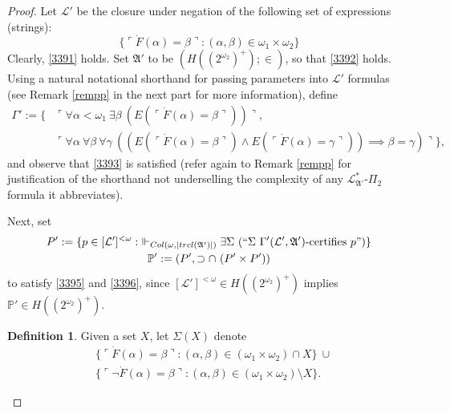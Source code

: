 \documentclass[12pt, twoside]{memoir}
\numberwithin{equation}{section}
\theoremstyle{definition}
\newtheorem{defi}[thm]{Definition}
\theoremstyle{remark}
\theoremstyle{definition}
\theoremstyle{definition}
\theoremstyle{definition}
\theoremstyle{remark}
\begin{document}
\begin{proof}
Let $\mathcal{L}'$ be the closure under negation of the following set of expressions (strings):
\begin{equation*}
    \{\ulcorner \dot{F} (\alpha) = \beta \urcorner : (\alpha, \beta) \in \omega_1 \times \omega_2\}
\end{equation*}
Clearly, \ref{3391} holds. Set $\mathfrak{A}'$ to be $(H((2^{\omega_2})^+); \in)$, so that \ref{3392} holds. Using a natural notational shorthand for passing parameters into $\mathcal{L}'$ formulas (see Remark \ref{rempp} in the next part for more information), define 
\begin{align*}
    \Gamma' := \{ & \ulcorner \forall \alpha < \omega_1 \ \exists \beta \ (E(\ulcorner \dot{F}(\alpha) = \beta \urcorner)) \urcorner, \\ 
    & \ulcorner \forall \alpha \ \forall \beta \ \forall \gamma \ ((E(\ulcorner \dot{F}(\alpha) = \beta \urcorner) \wedge E(\ulcorner \dot{F}(\alpha) = \gamma \urcorner)) \implies \beta = \gamma) \urcorner\} \text{,}
\end{align*}
and observe that \ref{3393} is satisfied (refer again to Remark \ref{rempp} for justification of the shorthand not underselling the complexity of any $\mathcal{L}^{*}_{\mathfrak{A}'}$-$\Pi_2$ formula it abbreviates). 

Next, set 
\begin{gather*}
    P' := \{p \in [\mathcal{L}']^{< \omega} : \ \Vdash_{Col(\omega, |trcl(\mathfrak{A}')|)} \exists \Sigma \ (``\Sigma \ \Gamma'(\mathcal{L}', \mathfrak{A}') \text{-certifies } p")\} \\
    \mathbb{P}' := (P', \supset \cap \ (P' \times P'))
\end{gather*}
to satisfy \ref{3395} and \ref{3396}, since $[\mathcal{L}']^{< \omega} \in H((2^{\omega_2})^+)$ implies $\mathbb{P}' \in H((2^{\omega_2})^+)$.

\begin{defi}
Given a set $X$, let $\Sigma(X)$ denote
\begin{align*}
    & \{\ulcorner \dot{F} (\alpha) = \beta \urcorner : (\alpha, \beta) \in (\omega_1 \times \omega_2) \cap X\} \ \cup \\
    & \{\ulcorner \neg \dot{F} (\alpha) = \beta \urcorner : (\alpha, \beta) \in (\omega_1 \times \omega_2) \setminus X\} \text{.}
\end{align*}
\end{defi}


\end{proof}
\end{document}
